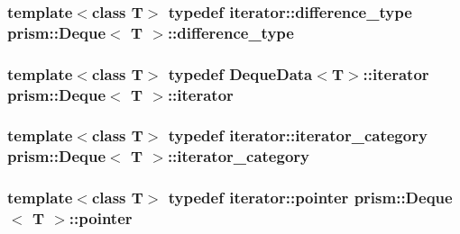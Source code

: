 \subsubsection[{\texorpdfstring{difference\+\_\+type}{difference_type}}]{\setlength{\rightskip}{0pt plus 5cm}template$<$class T$>$ typedef iterator\+::difference\+\_\+type {\bf prism\+::\+Deque}$<$ T $>$\+::{\bf difference\+\_\+type}}\hypertarget{classprism_1_1_deque_a2639a05f15b2d1748258ceb9f6e5c8c3}{}\label{classprism_1_1_deque_a2639a05f15b2d1748258ceb9f6e5c8c3}
\subsubsection[{\texorpdfstring{iterator}{iterator}}]{\setlength{\rightskip}{0pt plus 5cm}template$<$class T$>$ typedef Deque\+Data$<$T$>$\+::{\bf iterator} {\bf prism\+::\+Deque}$<$ T $>$\+::{\bf iterator}}\hypertarget{classprism_1_1_deque_af6fbdfa6e826f7f71b29f4d3cfb72ed1}{}\label{classprism_1_1_deque_af6fbdfa6e826f7f71b29f4d3cfb72ed1}
\subsubsection[{\texorpdfstring{iterator\+\_\+category}{iterator_category}}]{\setlength{\rightskip}{0pt plus 5cm}template$<$class T$>$ typedef iterator\+::iterator\+\_\+category {\bf prism\+::\+Deque}$<$ T $>$\+::{\bf iterator\+\_\+category}}\hypertarget{classprism_1_1_deque_a5a8e5c9e68bc92b45fcf5b1dcae7418b}{}\label{classprism_1_1_deque_a5a8e5c9e68bc92b45fcf5b1dcae7418b}
\subsubsection[{\texorpdfstring{pointer}{pointer}}]{\setlength{\rightskip}{0pt plus 5cm}template$<$class T$>$ typedef iterator\+::pointer {\bf prism\+::\+Deque}$<$ T $>$\+::{\bf pointer}}\hypertarget{classprism_1_1_deque_a9cff677f1cdffd6f9900a84fd0fa7b17}{}\label{classprism_1_1_deque_a9cff677f1cdffd6f9900a84fd0fa7b17}

